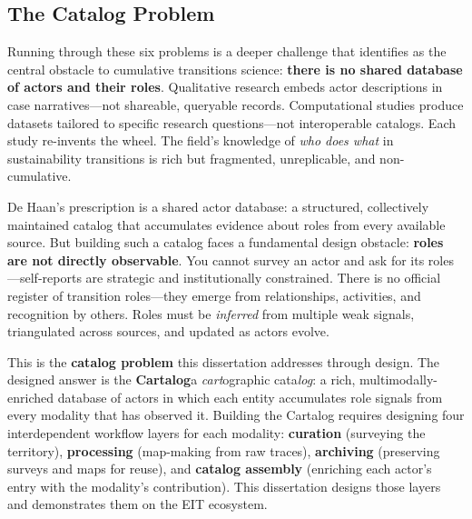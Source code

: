 \documentclass[../main.tex]{subfiles}
\begin{document}
\subsection{The Catalog Problem}

Running through these six problems is a deeper challenge that \textcite{dehaan2025makingscience} identifies as the central obstacle to cumulative transitions science: \textbf{there is no shared database of actors and their roles}. Qualitative research embeds actor descriptions in case narratives---not shareable, queryable records. Computational studies produce datasets tailored to specific research questions---not interoperable catalogs. Each study re-invents the wheel. The field's knowledge of \emph{who does what} in sustainability transitions is rich but fragmented, unreplicable, and non-cumulative.

De Haan's prescription is a shared actor database: a structured, collectively maintained catalog that accumulates evidence about roles from every available source. But building such a catalog faces a fundamental design obstacle: \textbf{roles are not directly observable}. You cannot survey an actor and ask for its roles---self-reports are strategic and institutionally constrained. There is no official register of transition roles---they emerge from relationships, activities, and recognition by others. Roles must be \emph{inferred} from multiple weak signals, triangulated across sources, and updated as actors evolve.

This is the \textbf{catalog problem} this dissertation addresses through design. The designed answer is the \textbf{Cartalog}\textemdash a \emph{cart}ographic cata\emph{log}: a rich, multimodally-enriched database of actors in which each entity accumulates role signals from every modality that has observed it. Building the Cartalog requires designing four interdependent workflow layers for each modality: \textbf{curation} (surveying the territory), \textbf{processing} (map-making from raw traces), \textbf{archiving} (preserving surveys and maps for reuse), and \textbf{catalog assembly} (enriching each actor's entry with the modality's contribution). This dissertation designs those layers and demonstrates them on the EIT ecosystem.
\end{document}
